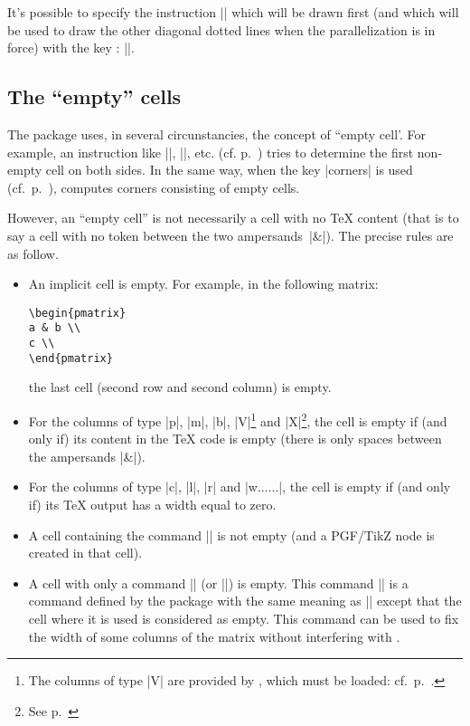 \documentclass[dvipsnames]{article}%
\begin{document}
It's possible to specify the instruction |\Ddots| which will be drawn first
(and which will be used to draw the other diagonal dotted lines when the
parallelization is in force) with the key :
||. 

\subsection[The empty cells]{The ``empty'' cells}

\label{empty-cells}
The package  uses, in several circunstancies, the concept of
``empty cell'. For example, an instruction like |\Ldots|, |\Cdots|, etc. (cf.
p.~\pageref{Cdots}) tries to determine the first non-empty cell on both sides.
In the same way, when the key |corners| is used (cf.~p.~\pageref{corners}),
 computes corners consisting of empty cells. 

However, an ``empty cell'' is not necessarily a cell with no TeX
content (that is to say a cell with no token between the two ampersands~|&|).
The precise rules are as follow.

\begin{itemize}
\item An implicit cell is empty. For example, in the following matrix:

\begin{Verbatim}
\begin{pmatrix}
a & b \\
c \\
\end{pmatrix}
\end{Verbatim}

the last cell (second row and second column) is empty.

\medskip
\item For the columns of type |p|, |m|, |b|, |V|\footnote{The columns of type
  |V| are provided by , which must be loaded:
  cf.~p.~\pageref{varwidth}.} and |X|\footnote{See p.~\pageref{X-columns}}, the
cell is empty if (and only if) its content in the TeX code is empty (there is
only spaces between the ampersands |&|).

\medskip
\item For the columns of type |c|, |l|, |r| and |w{...}{...}|, the cell is
empty if (and only if) its TeX output has a width equal to zero.

\medskip
\item {}
A cell containing the command |\NotEmpty| is not empty (and a
PGF/TikZ node is created in that cell).

\medskip
\item A cell with only a command |\Hspace| (or |\Hspace*|) is empty. This
command |\Hspace| is a command defined by the package  with
the same meaning as |\hspace| except that the cell where it is used is
considered as empty. This command can be used to fix the width of some columns
of the matrix without interfering with .
\end{itemize}
\end{document}
